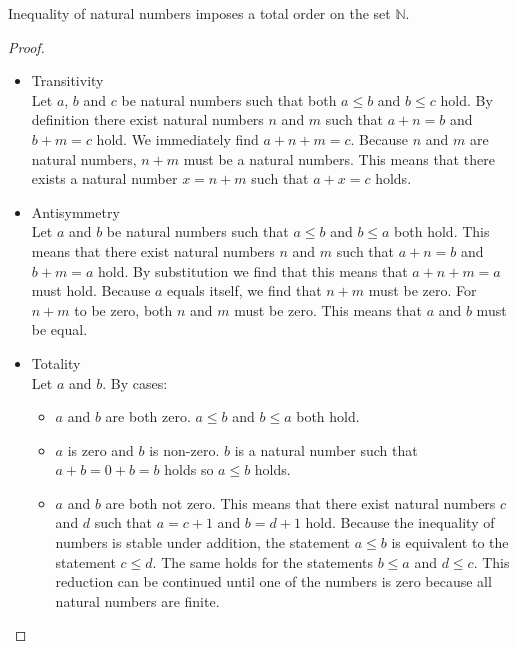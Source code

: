 \documentclass[main.tex]{subfiles}
\begin{document}
\begin{pr}
  Inequality of natural numbers imposes a total order on the set $\mathbb{N}$.

  \begin{proof}
    \noindent
    \begin{itemize}
      \item Transitivity\\
        Let $a$, $b$ and $c$ be natural numbers such that both $a \le b$ and $b \le c$ hold.
        By definition there exist natural numbers $n$ and $m$ such that $a + n = b$ and $b + m = c$ hold.
        We immediately find $a + n + m = c$.
        Because $n$ and $m$ are natural numbers, $n+m$ must be a natural numbers.
        This means that there exists a natural number $x = n + m$ such that $a+x = c$ holds.
      \item Antisymmetry\\
        Let $a$ and $b$ be natural numbers such that $a \le b$ and $b \le a$ both hold.
        This means that there exist natural numbers $n$ and $m$ such that $a + n = b$ and $b + m = a$ hold.
        By substitution we find that this means that $a + n + m = a$ must hold.
        Because $a$ equals itself, we find that $n+m$ must be zero.
        For $n+m$ to be zero, both $n$ and $m$ must be zero.
        This means that $a$ and $b$ must be equal.
      \item Totality\\
        Let $a$ and $b$.
        By cases:
        \noindent
        \begin{itemize}
          \item
            $a$ and $b$ are both zero.
            $a \le b$ and $ b\le a$ both hold.
          \item
            $a$ is zero and $b$ is non-zero.
            $b$ is a natural number such that $a + b = 0 + b = b$ holds so $a \le b$ holds.
          \item
            $a$ and $b$ are both not zero.
            This means that there exist natural numbers $c$ and $d$ such that $a = c + 1$ and $b = d + 1$ hold.
            Because the inequality of numbers is stable under addition, the statement $a \le b$ is equivalent to the statement $c \le d$.
            The same holds for the statements $b \le a$ and $d \le c$.
            This reduction can be continued until one of the numbers is zero because all natural numbers are finite.
        \end{itemize}
    \end{itemize}
  \end{proof}
\end{pr}
\end{document}
